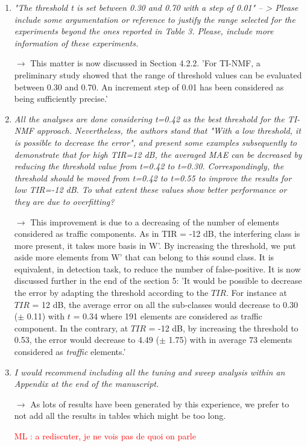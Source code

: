 \documentclass[10pt]{article}
\newcommand{\ml}[1]{\textcolor{red}{ML : #1}}
\begin{document}
\begin{enumerate}
\item \emph{"The threshold t is set between 0.30 and 0.70 with a step of 0.01" -- > Please include some argumentation or reference to justify the range selected for the experiments beyond the ones reported in Table 3. Please, include more information of these experiments.}

$\rightarrow$ This matter is now discussed in Section 4.2.2. 'For TI-NMF, a preliminary study showed that  the range of threshold values can be evaluated between 0.30 and 0.70. An increment step of 0.01 has been considered as being sufficiently precise.'

\item \emph{All the analyses are done considering t=0.42 as the best threshold for the TI-NMF approach. Nevertheless, the authors stand that "With a low threshold, it is possible to decrease the error", and present some examples subsequently to demonstrate that for high TIR=12 dB, the averaged MAE can be decreased by reducing the threshold value from t=0.42 to t=0.30. Correspondingly, the threshold should be moved from t=0.42 to t=0.55 to improve the results for low TIR=-12 dB. To what extent these values show better performance or they are due to overfitting?}

$\rightarrow$ This improvement is due to a decreasing of the number of elements considered as traffic components. As in TIR = -12 dB, the interfering class is more present, it takes more basis in W'. By increasing the threshold, we put aside more elements from W' that can belong to this sound class. It is equivalent, in detection task, to reduce the number of false-positive. It is now discussed further in the end of the section 5: 'It would be possible to decrease the error by adapting the threshold according to the $TIR$. For instance at $TIR$ = 12 dB, the average error on all the sub-classes would decrease to 0.30 ($\pm$ 0.11) with $t$ = 0.34 where 191 elements are considered as traffic component. In the contrary, at $TIR$ = -12 dB, by increasing the threshold to 0.53, the error would decrease to 4.49 ($\pm$ 1.75) with in average 73 elements considered as \textit{traffic} elements.'

\item \emph{I would recommend including all the tuning and sweep analysis within an Appendix at the end of the manuscript.}

$\rightarrow$ As lots of results have been generated by this experience, we prefer to not add all the results in tables which might be too long.

\ml{a rediscuter, je ne vois pas de quoi on parle}

\end{enumerate}
\end{document}
